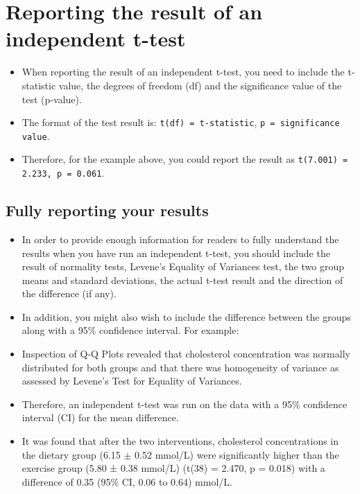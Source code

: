 \documentclass[]{article}
\begin{document}
\newpage
\section{Reporting the result of an independent t-test}
\begin{itemize}
	\item When reporting the result of an independent t-test, you need to include the t-statistic value, the degrees of freedom (df) and the significance value of the test (p-value). 
	\item The format of the test result is: \texttt{t(df) = t-statistic}, \texttt{p = significance value}. 
	\item Therefore, for the example above, you could report the result as \texttt{t(7.001) = 2.233, p = 0.061}.
\end{itemize}


\subsection{Fully reporting your results}
\begin{itemize}
	\item In order to provide enough information for readers to fully understand the results when you have run an independent t-test, you should include the result of normality tests, Levene's Equality of Variances test, the two group means and standard deviations, the actual t-test result and the direction of the difference (if any).
	\item  In addition, you might also wish to include the difference between the groups along with a 95\% confidence interval. For example:
\end{itemize}


\begin{framed}
\begin{itemize}
	\item Inspection of Q-Q Plots revealed that cholesterol concentration was normally distributed for both groups and that there was homogeneity of variance as assessed by Levene's Test for Equality of Variances. 
	\item Therefore, an independent t-test was run on the data with a 95\% confidence interval (CI) for the mean difference. 
	\item It was found that after the two interventions, cholesterol concentrations in the dietary group (6.15 $\pm$ 0.52 mmol/L) were significantly higher than the exercise group (5.80 ± 0.38 mmol/L) (t(38) = 2.470, p = 0.018) with a difference of 0.35 (95\% CI, 0.06 to 0.64) mmol/L.
\end{itemize}
\end{framed}
\end{document}
